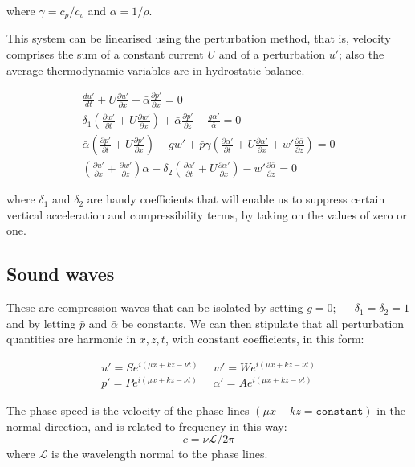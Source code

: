 where $\gamma = c_p/c_v$ and $\alpha = 1/\rho$.

This system can be linearised using the perturbation method, that is, velocity comprises the sum of a constant current $U$ and of a perturbation $u'$; also the average thermodynamic variables are in hydrostatic balance.

\begin{eqnarray}
	\frac{d u'}{dt} + U \frac{\partial u'}{\partial x} + \bar{\alpha} \frac{\partial p'}{\partial x} = 0 \\
	\delta_1 (\frac{\partial w'}{\partial t} + U \frac{\partial w'}{\partial x} ) + \bar{\alpha} \frac{\partial p'}{\partial z}  - \frac{g \alpha'}{\bar{\alpha}} =0 \nonumber\\
	\bar{\alpha}  (\frac{\partial p'}{\partial t} + U \frac{\partial p'}{\partial x} ) -g w'  +\bar{p}\gamma  ( \frac{\partial \alpha'}{\partial t} + U  \frac{\partial \alpha'}{\partial x} + w'  \frac{\partial \bar{\alpha}}{\partial z}) = 0 \nonumber \\
    (\frac{\partial u'}{\partial x} + \frac{\partial w'}{\partial z} ) \bar{\alpha} - \delta_2  ( \frac{\partial \alpha'}{\partial t} + U  \frac{\partial \alpha'}{\partial x}) - w'  \frac{\partial \bar{\alpha}}{\partial z}  = 0  \nonumber
\label{primitive_linear}
\end{eqnarray}

where $\delta_1$ and $\delta_2$ are handy coefficients that will enable us to suppress certain vertical acceleration and compressibility terms, by taking on the values of zero or one.

\subsection{Sound waves}

These are compression waves that can be isolated by setting $g=0$; ~~ $\delta_1=\delta_2=1$ and by letting $\bar{p}$ and $\bar{\alpha}$ be constants. 
We can then stipulate that all perturbation quantities are harmonic in $x,z,t$, with constant coefficients, in this form:

\begin{eqnarray}
u'=Se^{i (\mu x+kz-\nu t)}  ~~~~~~ w'=We^{i (\mu x+kz-\nu t ) }  \\
p'=Pe^{i (\mu x+kz-\nu t)}  ~~~~~~ \alpha'=Ae^{i (\mu x+kz-\nu t ) } \nonumber  
\end{eqnarray}

\begin{definition}
	The phase speed is the velocity of the phase lines $(\mu x+kz = \mathtt{constant})$ in the normal direction, and is related to frequency in this way:
	\begin{equation}
		c = \nu \mathcal{L} / 2 \pi
	\end{equation}
	where $\mathcal{L} $ is the wavelength normal to the phase lines. 
\end{definition}

